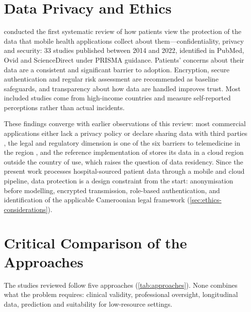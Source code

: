 \documentclass[11pt,a4paper,oneside]{report}
\begin{document}
\section{Data Privacy and Ethics}\label{sec:lr-privacy}

\Textcite{alhammad2024} conducted the first systematic review of how patients view the protection of the data that mobile health applications collect about them---confidentiality, privacy and security: 33 studies published between 2014 and 2022, identified in PubMed, Ovid and ScienceDirect under PRISMA guidance. Patients' concerns about their data are a consistent and significant barrier to adoption. Encryption, secure authentication and regular risk assessment are recommended as baseline safeguards, and transparency about how data are handled improves trust. Most included studies come from high-income countries and measure self-reported perceptions rather than actual incidents.

These findings converge with earlier observations of this review: most commercial applications either lack a privacy policy or declare sharing data with third parties \parencite{alessa2019}, the legal and regulatory dimension is one of the six barriers to telemedicine in the region \parencite{dodoo2022}, and the reference implementation of \textcite{efendi2025} stores its data in a cloud region outside the country of use, which raises the question of data residency. Since the present work processes hospital-sourced patient data through a mobile and cloud pipeline, data protection is a design constraint from the start: anonymisation before modelling, encrypted transmission, role-based authentication, and identification of the applicable Cameroonian legal framework (\cref{sec:ethics-considerations}).

\section{Critical Comparison of the Approaches}\label{sec:comparison}

The studies reviewed follow five approaches (\cref{tab:approaches}). None combines what the problem requires: clinical validity, professional oversight, longitudinal data, prediction and suitability for low-resource settings.
\end{document}
